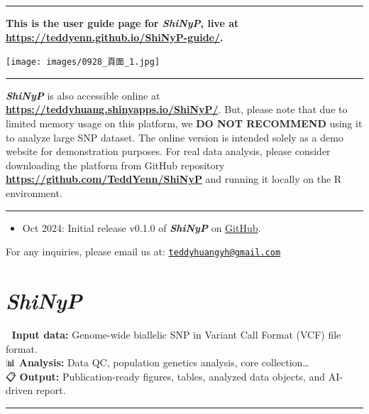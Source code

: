 \documentclass[
]{book}
\providecommand{\tightlist}{%
  \setlength{\itemsep}{0pt}\setlength{\parskip}{0pt}}
\begin{document}
\begin{center}\rule{0.5\linewidth}{0.5pt}\end{center}

\textbf{This is the user guide page for {\emph{ShiNyP}}, live at \url{https://teddyenn.github.io/ShiNyP-guide/}.}

\texttt{[image: images/0928\_頁面\_1.jpg]}

\begin{center}\rule{0.5\linewidth}{0.5pt}\end{center}

{\textbf{\emph{ShiNyP}}} is also accessible online at \href{https://teddyhuang.shinyapps.io/ShiNyP/}{\textbf{https://teddyhuang.shinyapps.io/ShiNyP/}}. But, please note that due to limited memory usage on this platform, we {\textbf{DO NOT RECOMMEND}} using it to analyze large SNP dataset. The online version is intended solely as a demo website for demonstration purposes. For real data analysis, please consider downloading the platform from GitHub repository \href{https://github.com/TeddYenn/ShiNyP}{\textbf{https://github.com/TeddYenn/ShiNyP}} and running it locally on the R environment.

\begin{center}\rule{0.5\linewidth}{0.5pt}\end{center}

\begin{itemize}
\tightlist
\item
  Oct 2024: Initial release v0.1.0 of {\textbf{\emph{ShiNyP}}} on \href{https://github.com/TeddYenn/ShiNyP}{GitHub}.
\end{itemize}

For any inquiries, please email us at: \href{mailto:teddyhuangyh@gmail.com}{\nolinkurl{teddyhuangyh@gmail.com}}

\chapter{\texorpdfstring{\emph{ShiNyP}}{ShiNyP}}\label{sec-shinyp}

📄 \textbf{Input data:} Genome-wide biallelic SNP in Variant Call Format (VCF) file format.\\
📊 \textbf{Analysis:} Data QC, population genetics analysis, core collection\ldots{}\\
📋 \textbf{Output:} Publication-ready figures, tables, analyzed data objects, and AI-driven report.

\begin{center}\rule{0.5\linewidth}{0.5pt}\end{center}
\end{document}
